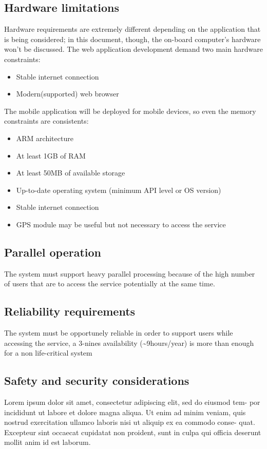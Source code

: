 \subsection{Hardware limitations}
\label{subsec: hw_constraints}
Hardware requirements are extremely different depending on the application that is being considered; in this document, though, the on-board computer's hardware won't be discussed.
The web application development demand two main hardware constraints: 
\begin{itemize}
	\item{Stable internet connection}
	\item{Modern(supported) web browser}
\end{itemize}
The mobile application will be deployed for mobile devices, so even the memory constraints are consistents:
\begin{itemize}
	\item{ARM architecture}
	\item{At least 1GB of RAM}
	\item{At least 50MB of available storage}
	\item{Up-to-date operating system (minimum API level or OS version)} 
	\item{Stable internet connection}
	\item{GPS module may be useful but not necessary to access the service}
\end{itemize}

\subsection{Parallel operation}
The system must support heavy parallel processing because of the high number of users that are to access the service potentially at the same time.

\subsection{Reliability requirements}
The system must be opportunely reliable in order to support users while accessing the service, a 3-nines availability (\textasciitilde9hours/year) is more than enough for a non life-critical system 

\subsection{Safety and security considerations}
Lorem ipsum dolor sit amet, consectetur adipiscing elit, sed do eiusmod tem- por incididunt ut labore et dolore magna aliqua. Ut enim ad minim veniam, quis nostrud exercitation ullamco laboris nisi ut aliquip ex ea commodo conse- quat. Excepteur sint occaecat cupidatat non proident, sunt in culpa qui officia deserunt mollit anim id est laborum.

